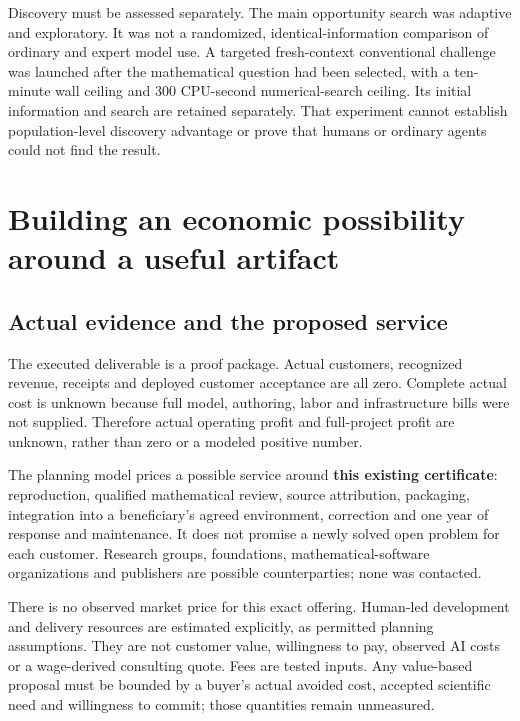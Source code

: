 \documentclass[11pt,a4paper]{article}
\begin{document}
Discovery must be assessed separately. The main opportunity search was
adaptive and exploratory. It was not a randomized, identical-information
comparison of ordinary and expert model use. A targeted fresh-context
conventional challenge was launched after the mathematical question had
been selected, with a ten-minute wall ceiling and 300 CPU-second
numerical-search ceiling. Its initial information and search are
retained separately. That experiment cannot establish population-level
discovery advantage or prove that humans or ordinary agents could not
find the result.


\hypertarget{building-an-economic-possibility-around-a-useful-artifact}{%
\section{Building an economic possibility around a useful
artifact}\label{building-an-economic-possibility-around-a-useful-artifact}}


\hypertarget{actual-evidence-and-the-proposed-service}{%
\subsection{Actual evidence and the proposed
service}\label{actual-evidence-and-the-proposed-service}}

The executed deliverable is a proof package. Actual customers,
recognized revenue, receipts and deployed customer acceptance are all
zero. Complete actual cost is unknown because full model, authoring,
labor and infrastructure bills were not supplied. Therefore actual
operating profit and full-project profit are unknown, rather than zero
or a modeled positive number.

The planning model prices a possible service around \textbf{this
existing certificate}: reproduction, qualified mathematical review,
source attribution, packaging, integration into a beneficiary's agreed
environment, correction and one year of response and maintenance. It
does not promise a newly solved open problem for each customer. Research
groups, foundations, mathematical-software organizations and publishers
are possible counterparties; none was contacted.

There is no observed market price for this exact offering. Human-led
development and delivery resources are estimated explicitly, as
permitted planning assumptions. They are not customer value, willingness
to pay, observed AI costs or a wage-derived consulting quote. Fees are
tested inputs. Any value-based proposal must be bounded by a buyer's
actual avoided cost, accepted scientific need and willingness to commit;
those quantities remain unmeasured.
\end{document}
